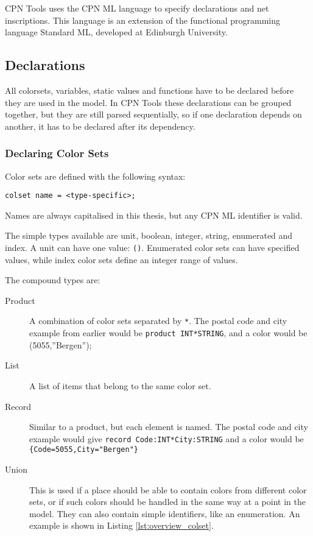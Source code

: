 	CPN Tools uses the CPN ML language to specify declarations and net inscriptions.
	This language is an extension of the functional programming language Standard
	ML, developed at Edinburgh University.

\subsection{Declarations}
	
	All colorsets, variables, static values and functions have to be declared
	before they are used in the model. In CPN Tools these declarations can be
	grouped together, but they are still parsed sequentially, so if one declaration
	depends on another, it has to be declared after its dependency.
	
	\subsubsection{Declaring Color Sets}
	
		Color sets are defined with the following syntax:
		
		\lstinline:colset name = <type-specific>;:
		
		Names are always capitalised in this thesis, but any CPN ML identifier is
		valid. 
		
		The simple types available are unit, boolean, integer, string, enumerated
		and index. A unit can have one value: \lstinline:():. Enumerated color sets
		can have specified values, while index color sets define an integer range of
		values. 
		
		The compound types are:
		\begin{description}
		\item[Product] A combination of color sets separated by \lstinline:*:. The
		postal code and city example from earlier would be
		\lstinline:product INT*STRING:, and a color would be (5055,''Bergen'');
		\item[List] A list of items that belong to the same color set.
		\item[Record] Similar to a product, but each element is named. The postal code
		and city example would give \lstinline-record Code:INT*City:STRING- and a
		color would be \lstinline:{Code=5055,City="Bergen"}:
		\item[Union] This is used if a place should be able to contain colors from
		different color sets, or if such colors should be handled in the same way at a
		point in the model. They can also contain simple identifiers, like an
		enumeration. An example is shown in Listing \ref{lst:overview_colset}.
		\end{description}
		
